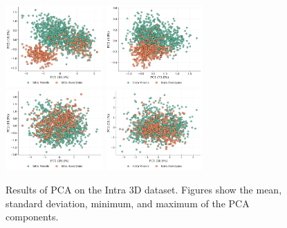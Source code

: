 \documentclass[%
 reprint,
 amsmath,amssymb,
 aps,
 floatfix,
 nofootinbib,
]{revtex4-2}
\begin{document}
\begin{figure}[h!]
    \centering
    \includegraphics[width=0.33\textwidth]{pca_intra_mean.png}
    \includegraphics[width=0.33\textwidth]{pca_intra_std.png}
    \includegraphics[width=0.33\textwidth]{pca_intra_min.png}
    \includegraphics[width=0.33\textwidth]{pca_intra_max.png}
    \caption{Results of PCA on the Intra 3D dataset. Figures show the mean, standard deviation, minimum, and maximum of the PCA components.}
    \label{fig:pca_supplementary_intra}
\end{figure}
\end{document}
